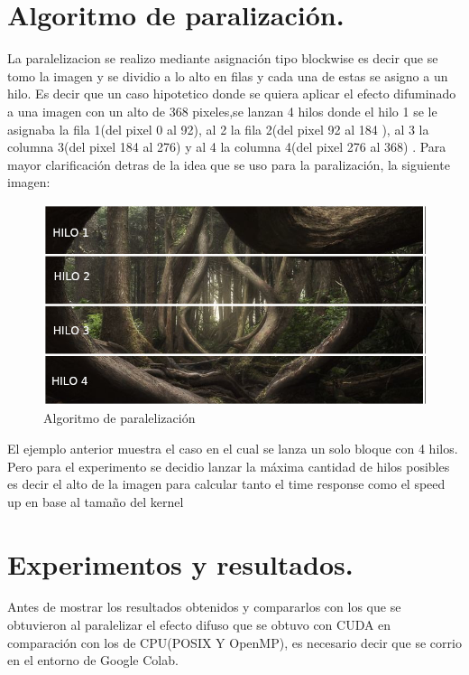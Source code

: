 \documentclass{IEEEtran}
\begin{document}
\section{Algoritmo de paralización.}
La paralelizacion se realizo mediante asignación tipo blockwise es decir que se tomo la imagen y se dividio a lo alto en filas y cada una de estas se asigno a un hilo. Es decir que un caso hipotetico donde se quiera aplicar el efecto difuminado a una imagen con un alto de 368 pixeles,se  lanzan 4 hilos donde el hilo 1 se le asignaba la fila 1(del pixel 0 al 92), al 2 la fila 2(del pixel 92 al 184 ), al 3 la columna 3(del pixel 184 al 276)  y al 4 la  columna 4(del pixel 276 al 368) . Para mayor clarificación detras de la idea que se uso para la paralización, la siguiente imagen:

\begin{figure}[H]
  \includegraphics[width=\linewidth]{mod.jpg}
  \caption{Algoritmo de paralelización}
  \label{fig:boat2}
\end{figure}

El ejemplo anterior muestra el caso en el cual se lanza un solo bloque con 4 hilos. Pero para el experimento se decidio lanzar la máxima cantidad de hilos posibles es decir el alto de la imagen para calcular tanto el time response como el speed up en base al tamaño del kernel
\section{Experimentos y resultados.}
Antes de mostrar los resultados obtenidos y compararlos con los que se obtuvieron al paralelizar el efecto difuso que se obtuvo con CUDA en comparación con los de CPU(POSIX Y OpenMP), es necesario decir que se corrio en el entorno de Google Colab. 
\end{document}
